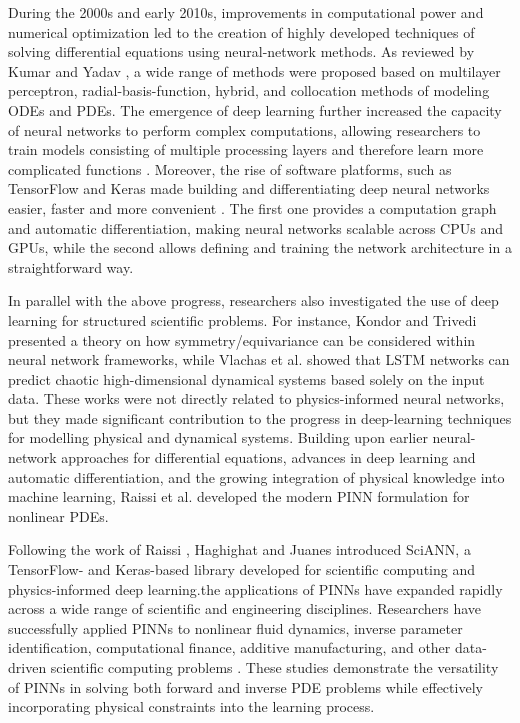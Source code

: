 \documentclass[11pt]{article}
\begin{document}
During the 2000s and early 2010s, improvements in computational power and numerical optimization 
led to the creation of highly developed techniques of solving differential equations using neural-network methods. 
As reviewed by Kumar and Yadav \cite{kumarMultilayerPerceptronsRadial2011} , a wide range of methods were proposed based on 
multilayer perceptron, radial-basis-function, hybrid,
and collocation methods of modeling ODEs and PDEs. The emergence of deep learning further increased 
the capacity of neural networks to perform complex computations, allowing researchers to train models consisting of multiple 
processing layers 
and therefore learn more complicated functions \cite{lecunDeepLearning2015}. Moreover, the rise of software platforms, such as 
TensorFlow and Keras made 
building and differentiating deep neural networks easier, faster and more convenient \cite{abadi2016tensorflow, ketkar2017introduction}. 
The first one provides a computation 
graph and automatic differentiation, making neural networks scalable across CPUs and GPUs, while the second allows defining and 
training the network architecture in a straightforward way.


In parallel with the above progress, researchers also investigated the use of deep learning for structured scientific problems.
For instance, Kondor and Trivedi \cite{kondor2018generalization} presented a theory on how symmetry/equivariance can be considered 
within neural network
frameworks, while Vlachas et al. \cite{vlachasDatadrivenForecastingHighdimensional2018} showed that LSTM networks can predict 
chaotic high-dimensional dynamical systems 
based solely on the input data. These works were not directly related to physics-informed neural networks,
but they made significant contribution to the progress in deep-learning techniques for modelling physical and dynamical systems.
Building upon earlier neural-network approaches for differential equations, advances in deep learning and automatic differentiation, 
and the growing integration of physical knowledge into machine learning, Raissi et al. 
\cite{raissiPhysicsinformedNeuralNetworks2019} developed the modern PINN formulation for nonlinear PDEs.

Following the work of Raissi , Haghighat and Juanes \cite{haghighatSciANNKerasTensorflow2021} introduced SciANN, a 
TensorFlow- and Keras-based 
library developed for scientific computing and physics-informed deep learning.the applications of 
PINNs have expanded rapidly across a wide range of scientific and engineering disciplines. Researchers 
have successfully applied PINNs to nonlinear fluid dynamics, inverse parameter 
identification, computational finance, additive manufacturing, and other data-driven 
scientific computing problems \cite{zhuMachineLearningMetal2020,xuExploreMissingFlow2021,taniosPhysicsInformedNeural2021,savovicComparativeStudyExplicit2023a}. These studies demonstrate the versatility of PINNs 
in solving both forward and inverse PDE problems while effectively incorporating physical 
constraints into the learning process.
\end{document}
